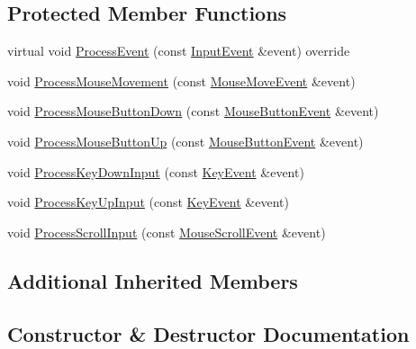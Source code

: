 \subsection*{Protected Member Functions}
\begin{DoxyCompactItemize}
\item 
virtual void \mbox{\hyperlink{classngl_1_1_camera_controller_ab7dc975eba1a28e8ade7da84ba0ddc86}{Process\+Event}} (const \mbox{\hyperlink{structngl_1_1_input_event}{Input\+Event}} \&event) override
\item 
void \mbox{\hyperlink{classngl_1_1_camera_controller_a1f1dcbaa8fa1b1f641163537de99caef}{Process\+Mouse\+Movement}} (const \mbox{\hyperlink{structngl_1_1_mouse_move_event}{Mouse\+Move\+Event}} \&event)
\item 
void \mbox{\hyperlink{classngl_1_1_camera_controller_a01877cc1edc8f75b65f9b5e7ed6c4d97}{Process\+Mouse\+Button\+Down}} (const \mbox{\hyperlink{structngl_1_1_mouse_button_event}{Mouse\+Button\+Event}} \&event)
\item 
void \mbox{\hyperlink{classngl_1_1_camera_controller_a52c7a211368e334c15e20ea9ebe24bc9}{Process\+Mouse\+Button\+Up}} (const \mbox{\hyperlink{structngl_1_1_mouse_button_event}{Mouse\+Button\+Event}} \&event)
\item 
void \mbox{\hyperlink{classngl_1_1_camera_controller_aa5b1beb587916565543b0b01ee1ac2cf}{Process\+Key\+Down\+Input}} (const \mbox{\hyperlink{structngl_1_1_key_event}{Key\+Event}} \&event)
\item 
void \mbox{\hyperlink{classngl_1_1_camera_controller_abc7edc589cc85b663e07eedcc8fc7f80}{Process\+Key\+Up\+Input}} (const \mbox{\hyperlink{structngl_1_1_key_event}{Key\+Event}} \&event)
\item 
void \mbox{\hyperlink{classngl_1_1_camera_controller_a06a2ea54f5e7a296d02e60c66074cb44}{Process\+Scroll\+Input}} (const \mbox{\hyperlink{structngl_1_1_mouse_scroll_event}{Mouse\+Scroll\+Event}} \&event)
\end{DoxyCompactItemize}
\subsection*{Additional Inherited Members}


\subsection{Constructor \& Destructor Documentation}
\mbox{\label{classngl_1_1_camera_controller_ad14cf69d4f7bd72450d1ebc2066852b5}} 
